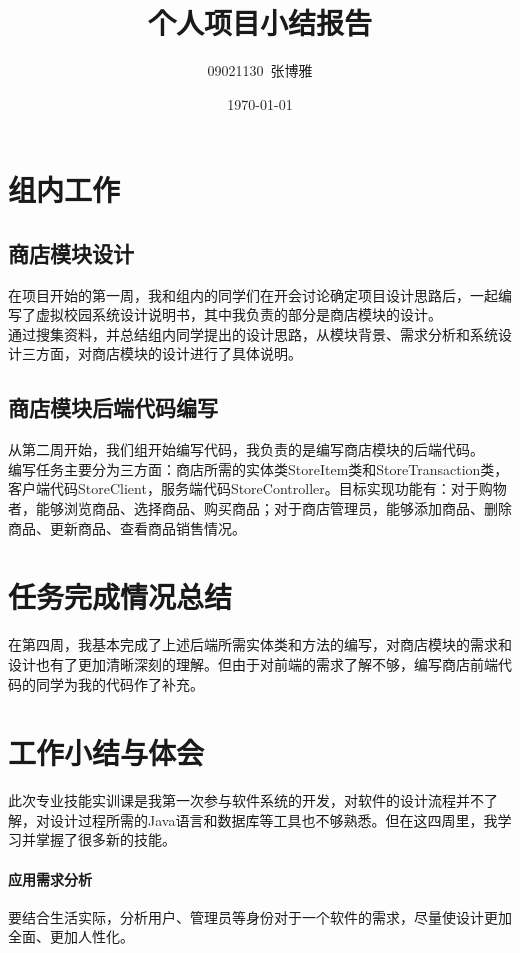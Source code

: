 \documentclass{article}
\title{个人项目小结报告}
\author{09021130~张博雅}
\date{\today}
\begin{document}
\maketitle

\section{组内工作}

\subsection{商店模块设计}
在项目开始的第一周，我和组内的同学们在开会讨论确定项目设计思路后，一起编写了虚拟校园系统设计说明书，其中我负责的部分是商店模块的设计。\\

通过搜集资料，并总结组内同学提出的设计思路，从模块背景、需求分析和系统设计三方面，对商店模块的设计进行了具体说明。
\subsection{商店模块后端代码编写}
从第二周开始，我们组开始编写代码，我负责的是编写商店模块的后端代码。\\

编写任务主要分为三方面：商店所需的实体类StoreItem类和StoreTransaction类，客户端代码StoreClient，服务端代码StoreController。目标实现功能有：对于购物者，能够浏览商品、选择商品、购买商品；对于商店管理员，能够添加商品、删除商品、更新商品、查看商品销售情况。

\section{任务完成情况总结}
在第四周，我基本完成了上述后端所需实体类和方法的编写，对商店模块的需求和设计也有了更加清晰深刻的理解。但由于对前端的需求了解不够，编写商店前端代码的同学为我的代码作了补充。
\section{工作小结与体会}
此次专业技能实训课是我第一次参与软件系统的开发，对软件的设计流程并不了解，对设计过程所需的Java语言和数据库等工具也不够熟悉。但在这四周里，我学习并掌握了很多新的技能。

\paragraph{应用需求分析}
要结合生活实际，分析用户、管理员等身份对于一个软件的需求，尽量使设计更加全面、更加人性化。
\end{document}
